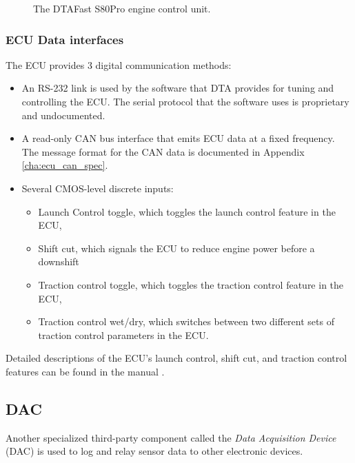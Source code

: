 \begin{figure}[H]
\centering
\caption{The DTAFast S80Pro engine control unit.}
\label{fig:s80pro_product}
\end{figure}

\subsubsection{ECU Data interfaces\label{sec:background_ecu_data_interfaces}}

The ECU provides 3 digital communication methods:
\begin{itemize}
  \item An RS-232 link is used by the software that DTA provides for tuning and controlling the ECU. The serial protocol that the software uses is proprietary and undocumented.
  \item A read-only CAN bus interface that emits ECU data at a fixed frequency. The message format for the CAN data is documented in Appendix \ref{cha:ecu_can_spec}.
  \item Several CMOS-level discrete inputs:
  \begin{itemize}
    \item Launch Control toggle, which toggles the launch control feature in the ECU,
    \item Shift cut, which signals the ECU to reduce engine power before a downshift
    \item Traction control toggle, which toggles the traction control feature in the ECU,
    \item Traction control wet/dry, which switches between two different sets of traction control parameters in the ECU.
  \end{itemize}
\end{itemize}

Detailed descriptions of the ECU's launch control, shift cut, and traction control features can be found in the manual \cite{s80pro}.
 

\subsection{DAC}

Another specialized third-party component called the \emph{Data Acquisition Device} (DAC) is used to log and relay sensor data to other electronic devices.

